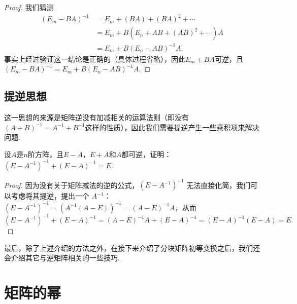\begin{proof}
    我们猜测
    \begin{align*}
        (E_m-BA)^{-1} & =E_m+(BA)+(BA)^2+\cdots       \\
                      & =E_m+B(E_n+AB+(AB)^2+\cdots)A \\
                      & =E_m+B(E_n-AB)^{-1}A.
    \end{align*}
    事实上经过验证这一结论是正确的（具体过程省略），因此$E_m \pm BA$可逆，且$(E_m-BA)^{-1}=E_m+B(E_n-AB)^{-1}A$.
\end{proof}

\subsection{提逆思想}

这一思想的来源是矩阵逆没有加减相关的运算法则（即没有$(A+B)^{-1}=A^{-1}+B^{-1}$这样的性质），因此我们需要提逆产生一些乘积项来解决问题.
\begin{example}{}{}
    设$A$是$n$阶方阵，且$E-A$，$E+A$和$A$都可逆，证明：$(E-A^{-1})^{-1}+(E-A)^{-1}=E$.
\end{example}

\begin{proof}
    因为没有关于矩阵减法的逆的公式，$(E - A^{-1})^{-1}$ 无法直接化简，我们可以考虑将其提逆，提出一个 $A^{-1}$：$(E-A^{-1})^{-1} = (A^{-1}(A-E))^{-1} = (A-E)^{-1}A$，从而
    \[(E-A^{-1})^{-1}+(E-A)^{-1}=(A-E)^{-1}A+(E-A)^{-1}=(E-A)^{-1}(E-A)=E.\]
\end{proof}

最后，除了上述介绍的方法之外，在接下来介绍了分块矩阵初等变换之后，我们还会介绍其它与逆矩阵相关的一些技巧.

\section{矩阵的幂} \label{sec:矩阵的幂}

